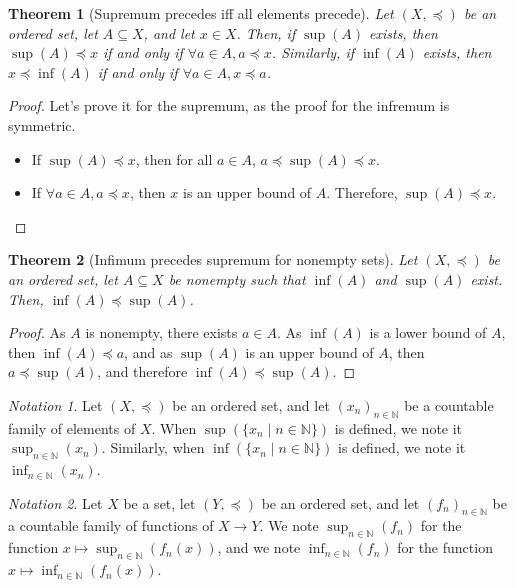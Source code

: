 \documentclass{article}
\newtheorem{theorem}{Theorem}[section]
\theoremstyle{definition}
\theoremstyle{remark}
\theoremstyle{example}
\theoremstyle{notation}
\newtheorem{notation}{Notation}[section]
\theoremstyle{axiom}
\begin{document}
\begin{theorem}[Supremum precedes iff all elements precede] \label{thm:supremum-precedes} %
		Let $(X, \preceq)$ be an ordered set, let $A \subseteq X$, and let $x \in X$. Then, if $\sup(A)$ exists, then $\sup(A) \preceq x$ if and only if $\forall a \in A, a \preceq x$. Similarly, if $\inf(A)$ exists, then $x \preceq \inf(A)$ if and only if $\forall a \in A, x \preceq a$.
\end{theorem}

\begin{proof} Let's prove it for the supremum, as the proof for the infremum is symmetric.
		\begin{itemize}
				\item If $\sup(A) \preceq x$, then for all $a \in A$, $a \preceq \sup(A) \preceq x$.
				\item If $\forall a \in A, a \preceq x$, then $x$ is an upper bound of $A$. Therefore, $\sup(A) \preceq x$.
		\end{itemize}
\end{proof}

\begin{theorem}[Infimum precedes supremum for nonempty sets] \label{thm:infimum-precedes-supremum}
		Let $(X, \preceq)$ be an ordered set, let $A \subseteq X$ be nonempty such that $\inf(A)$ and $\sup(A)$ exist. Then, $\inf(A) \preceq \sup(A)$.
\end{theorem}

\begin{proof}
		As $A$ is nonempty, there exists $a \in A$. As $\inf(A)$ is a lower bound of $A$, then $\inf(A) \preceq a$, and as $\sup(A)$ is an upper bound of $A$, then $a \preceq \sup(A)$, and therefore $\inf(A) \preceq \sup(A)$.
\end{proof}

\begin{notation}
		Let $(X, \preceq)$ be an ordered set, and let $(x_n)_{n \in \mathbb{N}}$ be a countable family of elements of $X$. When $\sup(\{x_n \mid n \in \mathbb{N}\})$ is defined, we note it $\sup_{n \in \mathbb{N}}(x_n)$. Similarly, when $\inf(\{x_n \mid n \in \mathbb{N}\})$ is defined, we note it $\inf_{n \in \mathbb{N}}(x_n)$.
\end{notation}

\begin{notation}
		Let $X$ be a set, let $(Y, \preceq)$ be an ordered set, and let $(f_n)_{n \in \mathbb{N}}$ be a countable family of functions of $X \rightarrow Y$. We note $\sup_{n \in \mathbb{N}}(f_n)$ for the function $x \mapsto \sup_{n \in \mathbb{N}}(f_n(x))$, and we note $\inf_{n \in \mathbb{N}}(f_n)$ for the function $x \mapsto \inf_{n \in \mathbb{N}}(f_n(x))$.
\end{notation}
\end{document}
